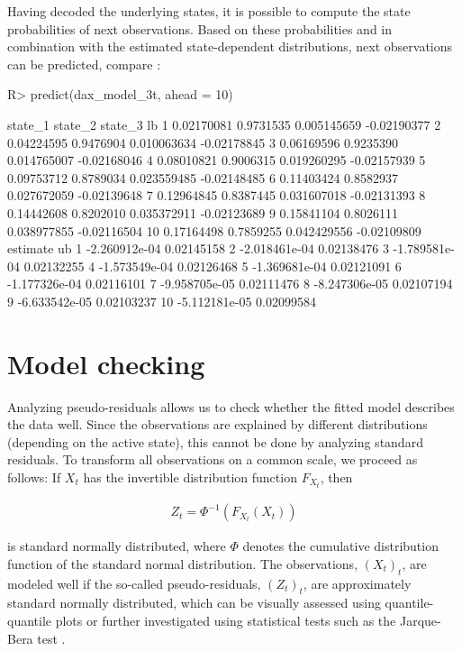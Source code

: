 \documentclass[article]{jss}
\begin{document}
Having decoded the underlying states, it is possible to compute the state probabilities of next observations. Based on these probabilities and in combination with the estimated state-dependent distributions, next observations can be predicted, compare \cite{zuc16}:

%
\begin{Schunk}
\begin{Sinput}
R> predict(dax_model_3t, ahead = 10)
\end{Sinput}
\begin{Soutput}
      state_1   state_2     state_3          lb
1  0.02170081 0.9731535 0.005145659 -0.02190377
2  0.04224595 0.9476904 0.010063634 -0.02178845
3  0.06169596 0.9235390 0.014765007 -0.02168046
4  0.08010821 0.9006315 0.019260295 -0.02157939
5  0.09753712 0.8789034 0.023559485 -0.02148485
6  0.11403424 0.8582937 0.027672059 -0.02139648
7  0.12964845 0.8387445 0.031607018 -0.02131393
8  0.14442608 0.8202010 0.035372911 -0.02123689
9  0.15841104 0.8026111 0.038977855 -0.02116504
10 0.17164498 0.7859255 0.042429556 -0.02109809
        estimate         ub
1  -2.260912e-04 0.02145158
2  -2.018461e-04 0.02138476
3  -1.789581e-04 0.02132255
4  -1.573549e-04 0.02126468
5  -1.369681e-04 0.02121091
6  -1.177326e-04 0.02116101
7  -9.958705e-05 0.02111476
8  -8.247306e-05 0.02107194
9  -6.633542e-05 0.02103237
10 -5.112181e-05 0.02099584
\end{Soutput}
\end{Schunk}
%

\section{Model checking} \label{sec:model_checking} %

Analyzing pseudo-residuals allows us to check whether the fitted model describes the data well. Since the observations are explained by different distributions (depending on the active state), this cannot be done by analyzing standard residuals. To transform all observations on a common scale, we proceed as follows: If $X_t$ has the invertible distribution function $F_{X_t}$, then

\begin{align*}
Z_t=\Phi^{-1}(F_{X_t} (X_t))
\end{align*}

is standard normally distributed, where $\Phi$ denotes the cumulative distribution function of the standard normal distribution. The observations, $(X_t)_t$, are modeled well if the so-called pseudo-residuals, $(Z_t)_t$, are approximately standard normally distributed, which can be visually assessed using quantile-quantile plots or further investigated using statistical tests such as the Jarque-Bera test \cite{zuc16}. 
\end{document}
